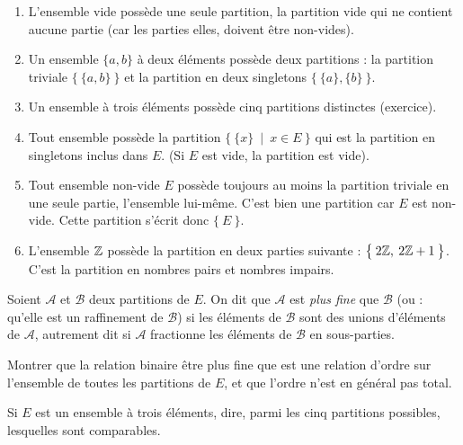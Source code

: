 \begin{exemple}
\begin{enumerate}
\item L'ensemble vide possède une seule partition, la partition vide qui ne contient aucune partie (car les parties elles, doivent être non-vides).
\item Un ensemble $\{a,b\}$ à deux éléments possède deux partitions : la partition triviale $\big\{\: \{a,b\} \:\big\}$ et la partition en deux singletons $\big\{\: \{a\},\{b\} \:\big\}$.
\item Un ensemble à trois éléments possède cinq partitions distinctes (exercice).
\item Tout ensemble possède la partition $\big\{\: \{x\}\:\mid\: x\in E \:\big\}$ qui est la partition en singletons inclus dans $E$. (Si $E$ est vide, la partition est vide).
\item Tout ensemble non-vide $E$ possède toujours au moins la partition triviale en une seule partie, l'ensemble lui-même. C'est bien une partition car $E$ est non-vide. Cette partition s'écrit donc $\big\{\: E \:\big\}$.
\item L'ensemble $\mathbb{Z}$ possède la partition en deux parties suivante : $\big\{\: 2\mathbb{Z}, \: 2\mathbb{Z}+1\:\big\}$. C'est la partition en nombres pairs et nombres impairs.
\end{enumerate}
\end{exemple}

\begin{definition}
Soient $\mathcal A$ et $\mathcal B$ deux partitions de $E$. On dit que $\mathcal A$ est \emph{plus fine} que $\mathcal B$ (ou : qu'elle est un raffinement de $\mathcal B$) si les éléments de $\mathcal B$ sont des unions d'éléments de $\mathcal A$, autrement dit si $\mathcal A$ fractionne les éléments de $\mathcal B$ en sous-parties.
\end{definition}


\begin{exercice}
Montrer que la relation binaire \og être plus fine que\fg{} est une relation d'ordre sur l'ensemble de toutes les partitions de $E$, et que l'ordre n'est en général pas total.

Si $E$ est un ensemble à trois éléments, dire, parmi les cinq partitions possibles, lesquelles sont comparables.
\end{exercice}


